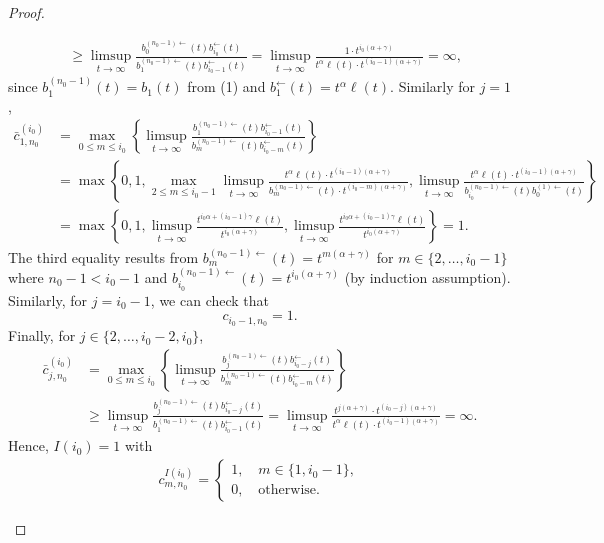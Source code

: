 \documentclass[aos]{imsart}
\numberwithin{equation}{section}
\theoremstyle{plain} %
\theoremstyle{remark}
\begin{document}
\begin{proof}
\begin{enumerate}[(1)]
\begin{align*}
& \ge \limsup_{t\to\infty} \frac{b_{0}^{(n_0-1)\leftarrow}(t)b_{i_0}^{\leftarrow}(t)}{b_{1}^{(n_0-1)\leftarrow}(t)b_{i_0-1}^{\leftarrow}(t)} = \limsup_{t\to\infty} \frac{1\cdot t^{i_0(\alpha+\gamma)}}{t^{\alpha}\ell(t)\cdot t^{(i_0-1)(\alpha+\gamma)}} =\infty,
\end{align*}
 since $ b_{1}^{(n_0-1)}(t)=b_1(t)$ from (1) and $b_1^{\leftarrow}(t)=t^{\alpha}\ell(t)$. Similarly for $j=1$,
\begin{align*}
\bar{c}_{1,n_0}^{(i_0)}& =\max_{0\le m\le i_0}\left\{\limsup_{t\to\infty} \frac{b_{1}^{(n_0-1)\leftarrow}(t)b_{i_0-1}^{\leftarrow}(t)}{b_{m}^{(n_0-1)\leftarrow}(t)b_{i_0-m}^{\leftarrow}(t)} \right\} \\
& =\max\left\{0, 1, \max_{2\le m \le i_0-1}\limsup_{t\to\infty} \frac{t^{\alpha}\ell(t) \cdot t^{(i_0-1)(\alpha+\gamma)}}{b_{m}^{(n_0-1)\leftarrow}(t)\cdot t^{(i_0-m)(\alpha+\gamma)}}, \limsup_{t\to\infty} \frac{t^{\alpha}\ell(t) \cdot t^{(i_0-1)(\alpha+\gamma)}}{b_{i_0}^{(n_0-1)\leftarrow}(t)b_{0}^{(1)\leftarrow}(t)} \right\} \\
& = \max\left\{0, 1,  \limsup_{t\to\infty} \frac{t^{i_0\alpha+(i_0-1)\gamma}\ell(t)}{t^{i_0(\alpha+\gamma)}}, \limsup_{t\to\infty} \frac{t^{i_0\alpha+(i_0-1)\gamma}\ell(t)}{t^{i_0(\alpha+\gamma)}}  \right\} =1.
\end{align*}
The third equality results from $b_m^{(n_0-1)\leftarrow}(t)= t^{m(\alpha+\gamma)}$ for $m\in \{2,\ldots, i_0-1\}$ where $n_0-1< i_0-1$  and $b_{i_0}^{(n_0-1)\leftarrow}(t) =t^{i_0(\alpha+\gamma)} $ (by induction assumption). Similarly, for $j=i_0-1$, we can check that
\[c_{i_0-1,n_0}=1.\] Finally, for $j\in \{2,\ldots, i_0-2, i_0\}$,
\begin{align*}
\bar{c}_{j,n_0}^{(i_0)}& =\max_{0\le m\le i_0}\left\{\limsup_{t\to\infty} \frac{b_{j}^{(n_0-1)\leftarrow}(t)b_{i_0-j}^{\leftarrow}(t)}{b_{m}^{(n_0-1)\leftarrow}(t)b_{i_0-m}^{\leftarrow}(t)} \right\} \\
& \ge \limsup_{t\to\infty} \frac{b_{j}^{(n_0-1)\leftarrow}(t)b_{i_0-j}^{\leftarrow}(t)}{b_{1}^{(n_0-1)\leftarrow}(t)b_{i_0-1}^{\leftarrow}(t)} = \limsup_{t\to\infty} \frac{t^{j(\alpha+\gamma)}\cdot t^{(i_0-j)(\alpha+\gamma)}}{t^{\alpha}\ell(t)\cdot t^{(i_0-1)(\alpha+\gamma)}} =\infty.
\end{align*}
Hence, $I(i_0)=1$ with
\begin{align*}
c_{m,n_0}^{I(i_0)} =\begin{cases}
    1, \quad m \in \{1,i_0-1\},\\
    0, \quad \text{otherwise}.
\end{cases}

\end{align*}
\end{enumerate}
\end{proof}
\end{document}
